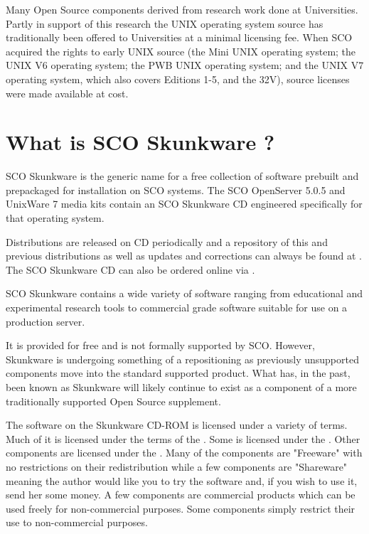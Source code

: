 \documentclass[letterpaper]{article}
\begin{document}
Many Open Source components derived from research work done at Universities.
Partly in support of this research the UNIX operating system source has
traditionally been offered to Universities at a minimal licensing fee. When
SCO acquired the rights to early UNIX source (the Mini UNIX operating system; 
the UNIX V6 operating system; the PWB UNIX operating system; and the UNIX V7 
operating system, which also covers Editions 1-5, and the 32V), source licenses
were made available at cost.




\section{What is SCO Skunkware ?}

SCO Skunkware is the generic name for a free collection of software 
prebuilt and prepackaged for installation on SCO systems. The SCO OpenServer
5.0.5 and UnixWare 7 media kits contain an SCO Skunkware CD engineered 
specifically for that operating system.

Distributions are released on CD periodically and a repository of this 
and previous distributions as well as updates and corrections can 
always be found at . The SCO Skunkware
CD can also be ordered online via .

SCO Skunkware contains a wide variety of software ranging from educational
and experimental research tools to commercial grade software suitable for
use on a production server. 

It is provided for free and is not formally supported by SCO. However, 
Skunkware is undergoing something of a repositioning as previously unsupported
components move into the standard supported product. What has, in the past,
been known as Skunkware will likely continue to exist as a component of a
more traditionally supported Open Source supplement.

The software on the Skunkware CD-ROM is licensed under a variety
of terms. Much of it is licensed under the terms of the 
.
Some is licensed under the
.
Other components are licensed under the
. Many of the components are
"Freeware" with no restrictions on their redistribution while a few components
are "Shareware" meaning the author would like you to try the software and,
if you wish to use it, send her some money. A few components are commercial
products which can be used freely for non-commercial purposes.
Some components simply restrict their use to non-commercial purposes.
\end{document}
